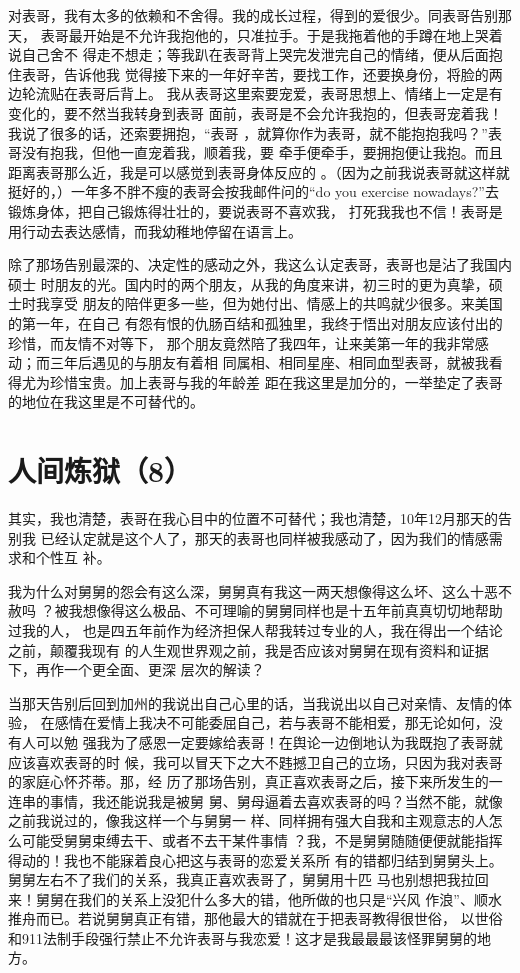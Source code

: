 \documentclass[12pt]{book}
\begin{document}
对表哥，我有太多的依赖和不舍得。我的成长过程，得到的爱很少。同表哥告别那天，
表哥最开始是不允许我抱他的，只准拉手。于是我拖着他的手蹲在地上哭着说自己舍不
得走不想走；等我趴在表哥背上哭完发泄完自己的情绪，便从后面抱住表哥，告诉他我
觉得接下来的一年好辛苦，要找工作，还要换身份，将脸的两边轮流贴在表哥后背上。
我从表哥这里索要宠爱，表哥思想上、情绪上一定是有变化的，要不然当我转身到表哥
面前，表哥是不会允许我抱的，但表哥宠着我！我说了很多的话，还索要拥抱，“表哥
，就算你作为表哥，就不能抱抱我吗？”表哥没有抱我，但他一直宠着我，顺着我，要
牵手便牵手，要拥抱便让我抱。而且距离表哥那么近，我是可以感觉到表哥身体反应的
。（因为之前我说表哥就这样就挺好的，）一年多不胖不瘦的表哥会按我邮件问的“do
you exercise nowadays?”去锻炼身体，把自己锻炼得壮壮的，要说表哥不喜欢我，
打死我我也不信！表哥是用行动去表达感情，而我幼稚地停留在语言上。

除了那场告别最深的、决定性的感动之外，我这么认定表哥，表哥也是沾了我国内硕士
时朋友的光。国内时的两个朋友，从我的角度来讲，初三时的更为真挚，硕士时我享受
朋友的陪伴更多一些，但为她付出、情感上的共鸣就少很多。来美国的第一年，在自己
有怨有恨的仇肠百结和孤独里，我终于悟出对朋友应该付出的珍惜，而友情不对等下，
那个朋友竟然陪了我四年，让来美第一年的我非常感动；而三年后遇见的与朋友有着相
同属相、相同星座、相同血型表哥，就被我看得尤为珍惜宝贵。加上表哥与我的年龄差
距在我这里是加分的，一举垫定了表哥的地位在我这里是不可替代的。
\section{人间炼狱（8）}
\label{sec-10-8}

其实，我也清楚，表哥在我心目中的位置不可替代；我也清楚，10年12月那天的告别我
已经认定就是这个人了，那天的表哥也同样被我感动了，因为我们的情感需求和个性互
补。

我为什么对舅舅的怨会有这么深，舅舅真有我这一两天想像得这么坏、这么十恶不赦吗
？被我想像得这么极品、不可理喻的舅舅同样也是十五年前真真切切地帮助过我的人，
也是四五年前作为经济担保人帮我转过专业的人，我在得出一个结论之前，颠覆我现有
的人生观世界观之前，我是否应该对舅舅在现有资料和证据下，再作一个更全面、更深
层次的解读？

当那天告别后回到加州的我说出自己心里的话，当我说出以自己对亲情、友情的体验，
在感情在爱情上我决不可能委屈自己，若与表哥不能相爱，那无论如何，没有人可以勉
强我为了感恩一定要嫁给表哥！在舆论一边倒地认为我既抱了表哥就应该喜欢表哥的时
候，我可以冒天下之大不韪撼卫自己的立场，只因为我对表哥的家庭心怀芥蒂。那，经
历了那场告别，真正喜欢表哥之后，接下来所发生的一连串的事情，我还能说我是被舅
舅、舅母逼着去喜欢表哥的吗？当然不能，就像之前我说过的，像我这样一个与舅舅一
样、同样拥有强大自我和主观意志的人怎么可能受舅舅束缚去干、或者不去干某件事情
？我，不是舅舅随随便便就能指挥得动的！我也不能寐着良心把这与表哥的恋爱关系所
有的错都归结到舅舅头上。舅舅左右不了我们的关系，我真正喜欢表哥了，舅舅用十匹
马也别想把我拉回来！舅舅在我们的关系上没犯什么多大的错，他所做的也只是“兴风
作浪”、顺水推舟而已。若说舅舅真正有错，那他最大的错就在于把表哥教得很世俗，
以世俗和911法制手段强行禁止不允许表哥与我恋爱！这才是我最最最该怪罪舅舅的地
方。
\end{document}
